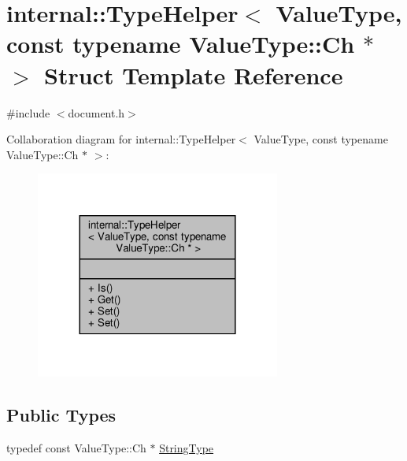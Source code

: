 \hypertarget{structinternal_1_1TypeHelper_3_01ValueType_00_01const_01typename_01ValueType_1_1Ch_01_5_01_4}{}\section{internal\+:\+:Type\+Helper$<$ Value\+Type, const typename Value\+Type\+:\+:Ch $\ast$ $>$ Struct Template Reference}
\label{structinternal_1_1TypeHelper_3_01ValueType_00_01const_01typename_01ValueType_1_1Ch_01_5_01_4}


{\ttfamily \#include $<$document.\+h$>$}



Collaboration diagram for internal\+:\+:Type\+Helper$<$ Value\+Type, const typename Value\+Type\+:\+:Ch $\ast$ $>$\+:
\nopagebreak
\begin{figure}[H]
\begin{center}
\leavevmode
\includegraphics[width=228pt]{structinternal_1_1TypeHelper_3_01ValueType_00_01const_01typename_01ValueType_1_1Ch_01_5_01_4__coll__graph}
\end{center}
\end{figure}
\subsection*{Public Types}
\begin{DoxyCompactItemize}
\item 
typedef const Value\+Type\+::\+Ch $\ast$ \hyperlink{structinternal_1_1TypeHelper_3_01ValueType_00_01const_01typename_01ValueType_1_1Ch_01_5_01_4_a61b7fd9c92eab60394fdff466251c399}{String\+Type}
\end{DoxyCompactItemize}
